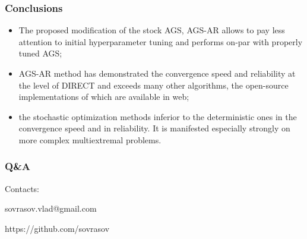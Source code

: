 \documentclass[aspectratio=1610]{beamer}
\newcommand\unnumbered{\setbeamertemplate{footline}{}}
\begin{document}
\begin{frame}
  \frametitle{Conclusions}
    \begin{itemize}
      \item The proposed modification of the stock AGS, AGS-AR allows to pay less attention to initial hyperparameter tuning and
      performs on-par with properly tuned AGS;
      \item AGS-AR method has demonstrated the convergence
      speed and reliability at the level of DIRECT and exceeds many other algorithms, the open-source
      implementations of which are available in web;
      \item the stochastic optimization methods inferior to the deterministic ones in the convergence
    speed and in reliability. It is manifested especially strongly on more complex multiextremal
    problems.
    \end{itemize}
\end{frame}

{
\unnumbered
\begin{frame}{{}}
  \frametitle{Q\&A}
  \begin{center}
    \Large{Contacts:}
\vspace{0.5cm}

    sovrasov.vlad@gmail.com

    https://github.com/sovrasov
  \end{center}
\end{frame}
}
\end{document}
